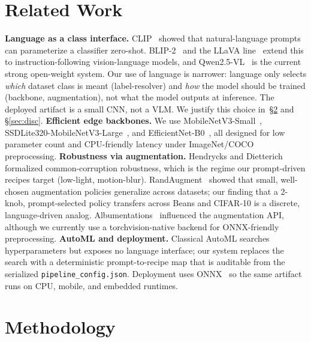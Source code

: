 \documentclass[10pt,twocolumn,letterpaper]{article}
\begin{document}
\section{Related Work}
\textbf{Language as a class interface.}
CLIP~\cite{radford2021clip} showed that natural-language prompts can
parameterize a classifier zero-shot. BLIP-2~\cite{li2023blip2} and
the LLaVA line~\cite{liu2023llava} extend this to instruction-following
vision-language models, and Qwen2.5-VL~\cite{bai2025qwen25vl} is the
current strong open-weight system. Our use of language is narrower:
language only selects \emph{which} dataset class is meant
(label-resolver) and \emph{how} the model should be trained
(backbone, augmentation), not what the model outputs at inference.
The deployed artifact is a small CNN, not a VLM. We justify this choice
in~\S\ref{sec:method} and \S\ref{sec:disc}.
\textbf{Efficient edge backbones.}
We use MobileNetV3-Small~\cite{howard2019searching},
SSDLite320-MobileNetV3-Large~\cite{liu2016ssd,howard2019searching}, and
EfficientNet-B0~\cite{tan2019efficientnet}, all designed for low
parameter count and CPU-friendly latency under
ImageNet/COCO~\cite{lin2014microsoft} preprocessing.
\textbf{Robustness via augmentation.}
Hendrycks and Dietterich~\cite{hendrycks2019benchmarking} formalized
common-corruption robustness, which is the regime our prompt-driven
recipes target (low-light, motion-blur).
RandAugment~\cite{cubuk2020randaugment} showed that small,
well-chosen augmentation policies generalize across datasets; our
finding that a 2-knob, prompt-selected policy transfers across Beans
and CIFAR-10 is a discrete, language-driven analog.
Albumentations~\cite{buslaev2020albumentations} influenced the
augmentation API, although we currently use a torchvision-native
backend for ONNX-friendly preprocessing.
\textbf{AutoML and deployment.}
Classical AutoML searches hyperparameters but exposes no language
interface; our system replaces the search with a deterministic
prompt-to-recipe map that is auditable from the serialized
\texttt{pipeline\_config.json}. Deployment uses
ONNX~\cite{onnx2019} so the same artifact runs on CPU, mobile,
and embedded runtimes.

\section{Methodology}
\label{sec:method}
\end{document}
